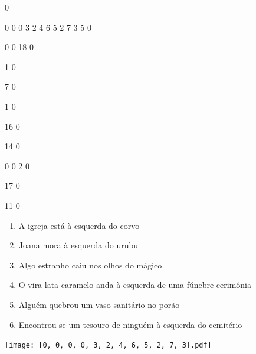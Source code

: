 \documentclass[12pt]{article}
\begin{document}
		\vfill  
		  
{
	0	%

	0	%
	0	%
	0	%
	3	%
	2	%
	4	%
	6	%
	5	%
	2	%
	7	%
	3	%
	5	%
	0	%

	0	%
	0	%
	18	%
	0	%

	1	%
	0	%

	7	%
	0	%

	1	%
	0	%

	16	%
	0	%

	14	%
	0	%

	0	%
	0	%
	2	%
	0	%

	17	%
	0	%

	11	%
	0	%

}	  
		    	

		 

\pagebreak


	\begin{enumerate}
		  \sffamily %
		  \large %


\vfill \item
A igreja está	%
à esquerda
do corvo	%

\vfill \item
Joana mora	%
à esquerda
do urubu	%

\vfill \item
Algo estranho caiu	%
nos olhos do mágico	%

\vfill \item
O vira-lata caramelo anda	%
à esquerda
de uma fúnebre cerimônia	%

\vfill \item
Alguém quebrou um vaso sanitário	%
no porão	%

\vfill \item
Encontrou-se um tesouro de ninguém	%
à esquerda
do cemitério	%
	\end{enumerate}
		  
		  \hfill

		  \vfill

\texttt{[image: [0, 0, 0, 0, 3, 2, 4, 6, 5, 2, 7, 3].pdf]}


	\hfill	  	  

\end{document}
